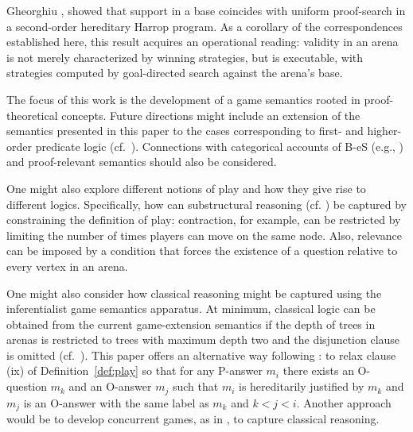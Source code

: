 \documentclass{lipics-v2021}
\begin{document}
Gheorghiu \cite{Gheorghiu2026SupportIsSearch},  showed that support in a  base coincides with uniform proof-search in a second-order hereditary Harrop program. As a corollary of the correspondences established here, this  result acquires an operational reading: validity in an arena is not merely characterized by winning strategies, but is executable, with strategies computed by goal-directed search against the arena's base.
     
The focus of this work is the development of a game semantics rooted in proof-theoretical concepts. Future directions might include an extension of the semantics presented in this paper to the cases corresponding to first- and higher-order predicate logic (cf.~\cite{Gheorghiu2025-FirstOrder,GP2025-P-tS-S-oL}). 
Connections with categorical accounts of B-eS (e.g., \cite{PymRitterRobinson2024}) and proof-relevant semantics should also be considered.  

One might also explore different notions of play and how they give rise to different logics. Specifically, how can substructural reasoning (cf. \cite{GheorghiuGuPym2023IMLL,gheorghiu_pts_bi_2025}) be captured by constraining the definition of play: contraction, for example, can be restricted by limiting the number of times players can move on the same node. Also, relevance can be imposed by a condition that forces the existence of a question relative to every vertex in an arena. 

One might also consider how  classical reasoning might be captured using the inferentialist game semantics apparatus. At minimum, classical logic can be obtained from the current game-extension semantics if the depth of trees in arenas is restricted to trees with maximum depth two and the disjunction clause is omitted (cf.~\cite{Gheorghiu2025-FirstOrder,Sandqvist2005inferentialist}). This paper offers an alternative way following \cite{Pym_ReductiveLogic}: to relax clause (ix) of Definition~\ref{def:play} so that for any P-answer $m_i$ there exists an O-question $m_k$ and an O-answer $m_j$ such that $m_i$ is hereditarily justified by $m_k$ and $m_j$ is an O-answer with the same label as $m_k$ and $k<j<i$. Another approach would be to develop concurrent games, as in \cite{alcolei_et_al:LIPIcs.CSL.2018.5}, to capture classical reasoning.   
    
\end{document}
